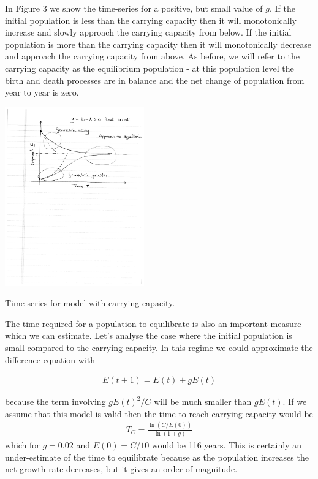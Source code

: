 In Figure 3 we show the time-series for a positive, but small value of $g$. If the initial population is less than the carrying capacity then it will monotonically increase and slowly approach the carrying capacity from below. If the initial population is more than the carrying capacity then it will monotonically decrease and approach the carrying capacity from above. As before, we will refer to the carrying capacity as the equilibrium population - at this population level the birth and death processes are in balance and the net change of population from year to year is zero. 

\begin{marginfigure}
\includegraphics[width=6cm]{figs/carrying_capacity}
\caption{Time-series for model with carrying capacity.}
\end{marginfigure}

The time required for a population to equilibrate is also an important measure which we can estimate. Let's analyse the case where the initial population is small compared to the carrying capacity. In this regime we could approximate the difference equation with

\begin{eqnarray*}
E(t+1) = E(t) + g E(t)
\end{eqnarray*}

because the term involving $gE(t)^2/C$ will be much smaller than $gE(t)$. If we assume that this model is valid then the time to reach carrying capacity would be
\begin{eqnarray*}
T_{C} = \frac{\ln(C/E(0))}{\ln(1+g)}
\end{eqnarray*}
which for $g= 0.02$ and $E(0) = C/10$ would be 116 years. This is certainly an under-estimate of the time to equilibrate because as the population increases the net growth rate decreases, but it gives an order of magnitude.

